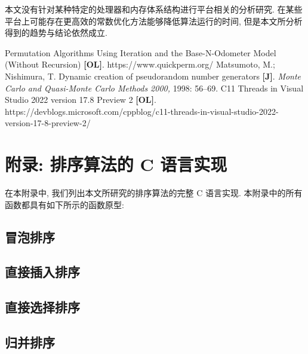 \documentclass[12pt]{article}
\begin{document}
本文没有针对某种特定的处理器和内存体系结构进行平台相关的分析研究. 在某些平台上可能存在更高效的常数优化方法能够降低算法运行的时间, 但是本文所分析得到的趋势与结论依然成立.

\begin{thebibliography}{}

 Permutation Algorithms Using Iteration and the Base-N-Odometer Model (Without Recursion) \textbf{[OL]}. https://www.quickperm.org/
 Matsumoto, M.; Nishimura, T. Dynamic creation of pseudorandom number generators \textbf{[J]}. \textit{Monte Carlo and Quasi-Monte Carlo Methods 2000,} 1998: 56–69.
 C11 Threads in Visual Studio 2022 version 17.8 Preview 2 \textbf{[OL]}. https://devblogs.microsoft.com/cppblog/c11-threads-in-visual-studio-2022-version-17-8-preview-2/

\end{thebibliography}

\appendix

\section{附录: 排序算法的 C 语言实现}

在本附录中, 我们列出本文所研究的排序算法的完整 C 语言实现. 本附录中的所有函数都具有如下所示的函数原型:



\subsection{冒泡排序}



\subsection{直接插入排序}



\subsection{直接选择排序}



\subsection{归并排序}
\end{document}
